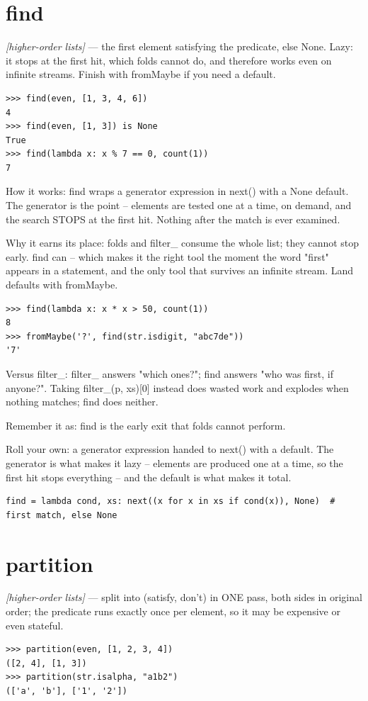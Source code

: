 \documentclass[11pt,letterpaper]{book}
\begin{document}
\section{find}
\noindent\textit{[higher-order lists]} --- the first element satisfying the predicate, else None. Lazy: it stops at the first hit, which folds cannot do, and therefore works even on infinite streams. Finish with fromMaybe if you need a default.
\begin{lstlisting}[style=spec]
>>> find(even, [1, 3, 4, 6])
4
>>> find(even, [1, 3]) is None
True
>>> find(lambda x: x % 7 == 0, count(1))
7
\end{lstlisting}

How it works: find wraps a generator expression in next() with a None default. The generator is the point -- elements are tested one at a time, on demand, and the search STOPS at the first hit. Nothing after the match is ever examined.


Why it earns its place: folds and filter\_ consume the whole list; they cannot stop early. find can -- which makes it the right tool the moment the word "first" appears in a statement, and the only tool that survives an infinite stream. Land defaults with fromMaybe.

\begin{lstlisting}[style=spec]
>>> find(lambda x: x * x > 50, count(1))
8
>>> fromMaybe('?', find(str.isdigit, "abc7de"))
'7'
\end{lstlisting}

Versus filter\_: filter\_ answers "which ones?"; find answers "who was first, if anyone?". Taking filter\_(p, xs)[0] instead does wasted work and explodes when nothing matches; find does neither.


Remember it as: find is the early exit that folds cannot perform.


Roll your own: a generator expression handed to next() with a default. The generator is what makes it lazy -- elements are produced one at a time, so the first hit stops everything -- and the default is what makes it total.

\begin{lstlisting}[style=code]
find = lambda cond, xs: next((x for x in xs if cond(x)), None)  # first match, else None
\end{lstlisting}

\section{partition}
\noindent\textit{[higher-order lists]} --- split into (satisfy, don't) in ONE pass, both sides in original order; the predicate runs exactly once per element, so it may be expensive or even stateful.
\begin{lstlisting}[style=spec]
>>> partition(even, [1, 2, 3, 4])
([2, 4], [1, 3])
>>> partition(str.isalpha, "a1b2")
(['a', 'b'], ['1', '2'])
\end{lstlisting}
\end{document}
